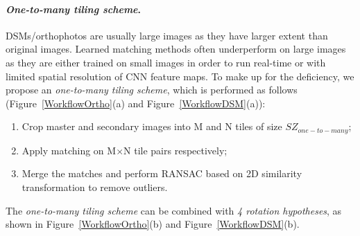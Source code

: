 \paragraph{\textit{One-to-many tiling scheme}.}
\ac{DSM}s/orthophotos are usually large images as they have larger extent than original images.
Learned matching methods often underperform on large images as they are either trained on small images in order to run real-time or with limited spatial resolution of \ac{CNN} feature maps. To make up for the deficiency, we propose an \textit{one-to-many tiling scheme}, which is performed as follows (Figure~\ref{WorkflowOrtho}(a) and Figure~\ref{WorkflowDSM}(a)):\\
\begin{enumerate}
    \item Crop master and secondary images into M and N tiles of size $SZ_{one-to-many}$; %
    \item Apply matching on M$\times$N tile pairs respectively;
    \item Merge the matches and perform RANSAC based on 2D similarity transformation to remove outliers.
\end{enumerate}                                   
\par
The \textit{one-to-many tiling scheme} can be combined with \textit{4 rotation hypotheses}, as shown in Figure~\ref{WorkflowOrtho}(b) and Figure~\ref{WorkflowDSM}(b).
